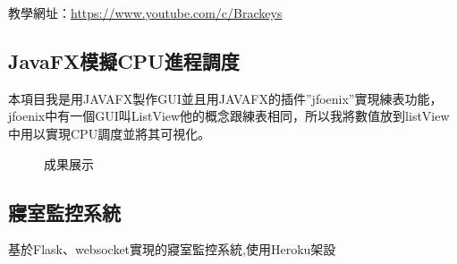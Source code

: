 \documentclass[classical]{einfart}
\begin{document}
教學網址：\url{https://www.youtube.com/c/Brackeys}
\subsection{JavaFX模擬CPU進程調度}

本項目我是用JAVAFX製作GUI並且用JAVAFX的插件”jfoenix”實現練表功能，jfoenix中有一個GUI叫ListView他的概念跟練表相同，所以我將數值放到listView中用以實現CPU調度並將其可視化。
\begin{figure}[H]
    \centering  %
    \caption{成果展示}
    \label{Fig.main}
\end{figure}
\subsection{寢室監控系統}

基於Flask、websocket實現的寢室監控系統,使用Heroku架設
\end{document}
